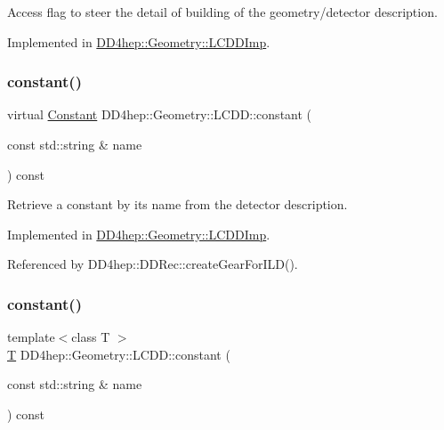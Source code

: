 Access flag to steer the detail of building of the geometry/detector description. 



Implemented in \hyperlink{class_d_d4hep_1_1_geometry_1_1_l_c_d_d_imp_ae875ad95398b372818df92a1e6752ff5}{D\+D4hep\+::\+Geometry\+::\+L\+C\+D\+D\+Imp}.

\hypertarget{class_d_d4hep_1_1_geometry_1_1_l_c_d_d_a7c7e23e0ff875bf83493430bfaeb77c4}{}\label{class_d_d4hep_1_1_geometry_1_1_l_c_d_d_a7c7e23e0ff875bf83493430bfaeb77c4} 
\subsubsection{\texorpdfstring{constant()}{constant()}\hspace{0.1cm}{\footnotesize\ttfamily [1/10]}}
{\footnotesize\ttfamily virtual \hyperlink{class_d_d4hep_1_1_geometry_1_1_constant}{Constant} D\+D4hep\+::\+Geometry\+::\+L\+C\+D\+D\+::constant (\begin{DoxyParamCaption}\item[{const std\+::string \&}]{name }\end{DoxyParamCaption}) const\hspace{0.3cm}{\ttfamily [pure virtual]}}



Retrieve a constant by it\textquotesingle{}s name from the detector description. 



Implemented in \hyperlink{class_d_d4hep_1_1_geometry_1_1_l_c_d_d_imp_a3c0bff57a62ca9d137206b6f6d5448d2}{D\+D4hep\+::\+Geometry\+::\+L\+C\+D\+D\+Imp}.



Referenced by D\+D4hep\+::\+D\+D\+Rec\+::create\+Gear\+For\+I\+L\+D().

\hypertarget{class_d_d4hep_1_1_geometry_1_1_l_c_d_d_ad4add3dc5cc881ea48ee69c0562a14e1}{}\label{class_d_d4hep_1_1_geometry_1_1_l_c_d_d_ad4add3dc5cc881ea48ee69c0562a14e1} 
\subsubsection{\texorpdfstring{constant()}{constant()}\hspace{0.1cm}{\footnotesize\ttfamily [2/10]}}
{\footnotesize\ttfamily template$<$class T $>$ \\
\hyperlink{class_t}{T} D\+D4hep\+::\+Geometry\+::\+L\+C\+D\+D\+::constant (\begin{DoxyParamCaption}\item[{const std\+::string \&}]{name }\end{DoxyParamCaption}) const}



